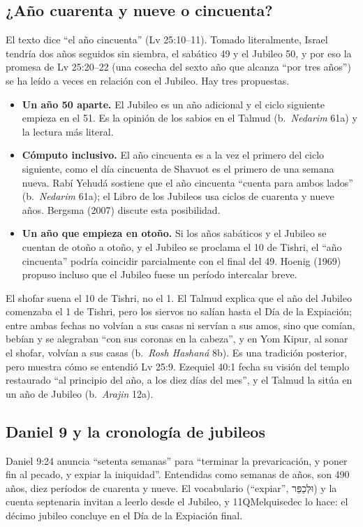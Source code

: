 \documentclass[11pt,letterpaper]{article}
\newcommand{\heb}[1]{\mbox{\foreignlanguage{hebrew}{#1}}}
\begin{document}
\subsection{¿Año cuarenta y nueve o cincuenta?}
El texto dice ``el año cincuenta'' (Lv 25:10--11). Tomado literalmente, Israel tendría dos años seguidos sin siembra, el sabático 49 y el Jubileo 50, y por eso la promesa de Lv 25:20--22 (una cosecha del sexto año que alcanza ``por tres años'') se ha leído a veces en relación con el Jubileo. Hay tres propuestas.
\begin{itemize}\setlength{\itemsep}{1pt}
\item \textbf{Un año 50 aparte.} El Jubileo es un año adicional y el ciclo siguiente empieza en el 51. Es la opinión de los sabios en el Talmud (b.~\emph{Nedarim} 61a) y la lectura más literal.
\item \textbf{Cómputo inclusivo.} El año cincuenta es a la vez el primero del ciclo siguiente, como el día cincuenta de Shavuot es el primero de una semana nueva. Rabí Yehudá sostiene que el año cincuenta ``cuenta para ambos lados'' (b.~\emph{Nedarim} 61a); el Libro de los Jubileos usa ciclos de cuarenta y nueve años. Bergsma (2007) discute esta posibilidad.
\item \textbf{Un año que empieza en otoño.} Si los años sabáticos y el Jubileo se cuentan de otoño a otoño, y el Jubileo se proclama el 10 de Tishri, el ``año cincuenta'' podría coincidir parcialmente con el final del 49. Hoenig (1969) propuso incluso que el Jubileo fuese un período intercalar breve.
\end{itemize}

\begin{nota}
El shofar suena el 10 de Tishri, no el 1. El Talmud explica que el año del Jubileo comenzaba el 1 de Tishri, pero los siervos no salían hasta el Día de la Expiación; entre ambas fechas no volvían a sus casas ni servían a sus amos, sino que comían, bebían y se alegraban ``con sus coronas en la cabeza'', y en Yom Kipur, al sonar el shofar, volvían a sus casas (b.~\emph{Rosh Hashaná} 8b). Es una tradición posterior, pero muestra cómo se entendió Lv 25:9. Ezequiel 40:1 fecha su visión del templo restaurado ``al principio del año, a los diez días del mes'', y el Talmud la sitúa en un año de Jubileo (b.~\emph{Arajin} 12a).
\end{nota}

\subsection{Daniel 9 y la cronología de jubileos}
Daniel 9:24 anuncia ``setenta semanas'' para ``terminar la prevaricación, y poner fin al pecado, y expiar la iniquidad''. Entendidas como semanas de años, son 490 años, diez períodos de cuarenta y nueve. El vocabulario (``expiar'', \heb{וּלְכַפֵּר}) y la cuenta septenaria invitan a leerlo desde el Jubileo, y 11QMelquisedec lo hace: el décimo jubileo concluye en el Día de la Expiación final.
\end{document}
